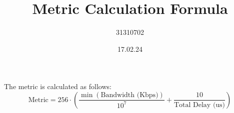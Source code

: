 \documentclass{article}
\begin{document}
\title{Metric Calculation Formula}
\author{31310702}
\date{17.02.24}

\maketitle

The metric is calculated as follows:
\begin{equation}
\text{Metric} = 256 \cdot \left( \frac{\min(\text{Bandwidth (Kbps)})}{10^7} + \frac{10}{\text{Total Delay (us)}} \right)
\end{equation}
\end{document}
